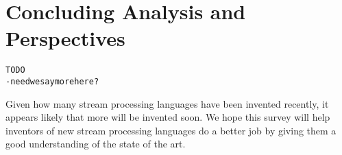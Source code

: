\section{Concluding Analysis and Perspectives}\label{sec:conclusion}

\begin{alltt}TODO\scriptsize
- need we say more here?
\end{alltt}

Given how many stream processing languages have been invented recently, it appears likely that more will be invented soon. We hope this survey will help inventors of new stream processing languages do a better job by giving them a good understanding of the state of the art.


